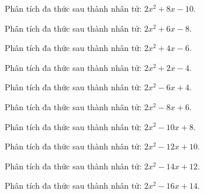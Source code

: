 \begin{bt}
	Phân tích đa thức sau thành nhân tử: $2 x^2 + 8 x - 10$.
\end{bt}
\begin{bt}
	Phân tích đa thức sau thành nhân tử: $2 x^2 + 6 x - 8$.
\end{bt}
\begin{bt}
	Phân tích đa thức sau thành nhân tử: $2 x^2 + 4 x - 6$.
\end{bt}
\begin{bt}
	Phân tích đa thức sau thành nhân tử: $2 x^2 + 2 x - 4$.
\end{bt}
\begin{bt}
	Phân tích đa thức sau thành nhân tử: $2 x^2 - 6 x + 4$.
\end{bt}
\begin{bt}
	Phân tích đa thức sau thành nhân tử: $2 x^2 - 8 x + 6$.
\end{bt}
\begin{bt}
	Phân tích đa thức sau thành nhân tử: $2 x^2 - 10 x + 8$.
\end{bt}
\begin{bt}
	Phân tích đa thức sau thành nhân tử: $2 x^2 - 12 x + 10$.
\end{bt}
\begin{bt}
	Phân tích đa thức sau thành nhân tử: $2 x^2 - 14 x + 12$.
\end{bt}
\begin{bt}
	Phân tích đa thức sau thành nhân tử: $2 x^2 - 16 x + 14$.
\end{bt}
